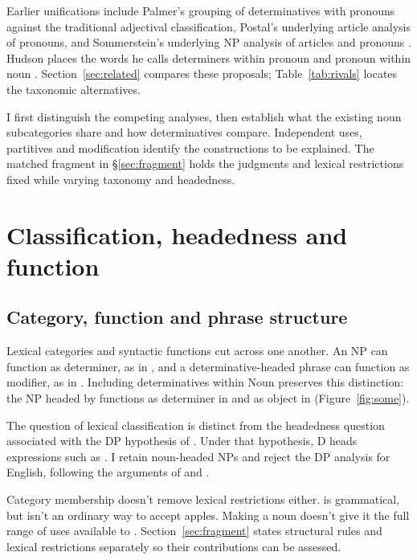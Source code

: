 \documentclass[12pt]{article}
\begin{document}
Earlier unifications include Palmer's grouping of determinatives with pronouns against the traditional adjectival classification, Postal's underlying article analysis of pronouns, and Sommerstein's underlying NP analysis of articles and pronouns \citep{palmer1924,postal1966,sommerstein1972}. Hudson places the words he calls determiners within pronoun and pronoun within noun \citep{hudson2004determiners,hudson2010wordgrammar}. Section~\ref{sec:related} compares these proposals; Table~\ref{tab:rivals} locates the taxonomic alternatives.

I first distinguish the competing analyses, then establish what the existing noun subcategories share and how determinatives compare. Independent uses, partitives and modification identify the constructions to be explained. The matched fragment in §\ref{sec:fragment} holds the judgments and lexical restrictions fixed while varying taxonomy and headedness.

\section{Classification, headedness and function}\label{sec:alternatives}

\subsection{Category, function and phrase structure}

Lexical categories and syntactic functions cut across one another. An NP can function as determiner, as in , and a determinative-headed phrase can function as modifier, as in  \citep{payne2010,pullummiller2022nps}. Including determinatives within Noun preserves this distinction: the NP headed by  functions as determiner in  and as object in  (Figure~\ref{fig:some}).

The question of lexical classification is distinct from the headedness question associated with the DP hypothesis of \textcite{abney1987}. Under that hypothesis, D heads expressions such as . I retain noun-headed NPs and reject the DP analysis for English, following the arguments of \textcite{pullummiller2022nps} and \textcite{bruening2020nominal}.

Category membership doesn't remove lexical restrictions either.  is grammatical, but  isn't an ordinary way to accept apples. Making  a noun doesn't give it the full range of uses available to . Section~\ref{sec:fragment} states structural rules and lexical restrictions separately so their contributions can be assessed.
\end{document}

